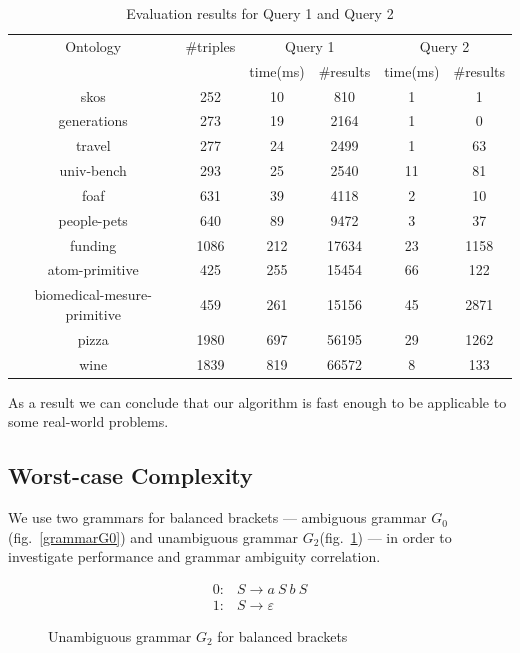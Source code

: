 \begin{table}
\centering
\caption{Evaluation results for Query 1 and Query 2}
\label{tbl1}

\begin{tabular}{ | c | c | c | c | c | c |}
\hline
Ontology & \#triples & \multicolumn{2}{|c|}{Query 1} & \multicolumn{2}{|c|}{Query 2} \\
\cline{3-6}
& & time(ms) & \#results & time(ms) & \#results \\
\hline 
\hline
skos        & 252 & 10 & 810 & 1 & 1 \\
generations & 273 & 19 & 2164 & 1 & 0 \\
travel      & 277 & 24 & 2499 & 1 & 63 \\
univ-bench  & 293 & 25 & 2540 & 11 & 81 \\
foaf        & 631 & 39 & 4118 & 2 & 10 \\
people-pets & 640 & 89 & 9472 & 3 & 37 \\
funding     & 1086 & 212 & 17634 & 23 & 1158 \\
atom-primitive & 425 & 255 & 15454 & 66 & 122 \\
biomedical-mesure-primitive & 459 & 261 & 15156 & 45 & 2871 \\
pizza       & 1980 & 697 & 56195 & 29 & 1262 \\
wine        & 1839 & 819 & 66572 & 8 & 133 \\
\hline
\end{tabular}

\end{table}

As a result we can conclude that our algorithm is fast enough to be applicable to some real-world problems.

\subsection{Worst-case Complexity} 

We use two grammars for balanced brackets --- ambiguous grammar $G_0$(fig.~\ref{grammarG0}) and unambiguous grammar $G_2$(fig.~\ref{grammarG2}) --- in order to investigate performance and grammar ambiguity correlation.

\begin{figure}[ht]
   \begin{center}
   \[
\begin{array}{rl}
   0: & S \rightarrow a \ S \ b \ S \\ 
   1: & S \rightarrow \varepsilon
\end{array}
\]
   \caption{Unambiguous grammar $G_2$ for balanced brackets}
   \label{grammarG2}        
   \end{center}
\end{figure}

